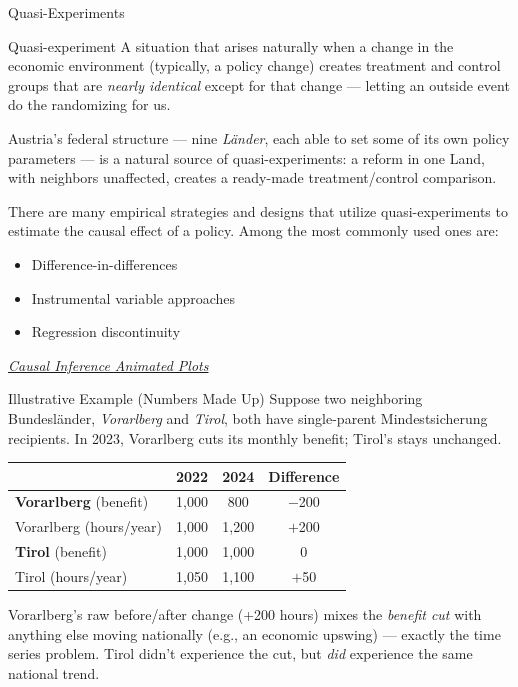 \documentclass[11pt,aspectratio=169]{beamer}
\begin{document}
\begin{frame}{Quasi-Experiments}
  \begin{block}{Quasi-experiment}
    A situation that arises naturally when a change in the economic environment (typically, a policy change) creates treatment and control groups that are \emph{nearly identical} except for that change --- letting an outside event do the randomizing for us.
  \end{block}
  \vspace{0.3em}
 
  Austria's federal structure --- nine \emph{Länder}, each able to set some of its own policy parameters --- is a natural source of quasi-experiments: a reform in one Land, with neighbors unaffected, creates a ready-made treatment/control comparison.
  

\end{frame}

\begin{frame}
	There are many empirical strategies and designs that utilize quasi-experiments to estimate the causal effect of a policy. Among the most commonly used ones are: 
	
	\begin{itemize}
		\item Difference-in-differences
		\item Instrumental variable approaches 
		\item Regression discontinuity 
	\end{itemize}
 
 
	\faHandPointer  \href{https://nickchk.com/causalgraphs.html}{\textit{Causal Inference Animated Plots}}
\end{frame}
\begin{frame}{Illustrative Example (Numbers Made Up)}
  \footnotesize
  Suppose two neighboring Bundesländer, \emph{Vorarlberg} and \emph{Tirol}, both have single-parent Mindestsicherung recipients. In 2023, Vorarlberg cuts its monthly benefit; Tirol's stays unchanged.
  \begin{center}
  \begin{tabular}{@{}lccc@{}}
    \toprule
     & \textbf{2022} & \textbf{2024} & \textbf{Difference} \\
    \midrule
    \textbf{Vorarlberg} (benefit) & \texteuro{}1{,}000 & \texteuro{}800 & $-$\texteuro{}200 \\
    Vorarlberg (hours/year) & 1{,}000 & 1{,}200 & $+$200 \\
    \midrule
    \textbf{Tirol} (benefit) & \texteuro{}1{,}000 & \texteuro{}1{,}000 & \texteuro{}0 \\
    Tirol (hours/year) & 1{,}050 & 1{,}100 & $+$50 \\
    \bottomrule
  \end{tabular}
  \end{center}
  \vspace{0.3em}
  Vorarlberg's raw before/after change (+200 hours) mixes the \emph{benefit cut} with anything else moving nationally (e.g., an economic upswing) --- exactly the time series problem. Tirol didn't experience the cut, but \emph{did} experience the same national trend.
\end{frame}
\end{document}

